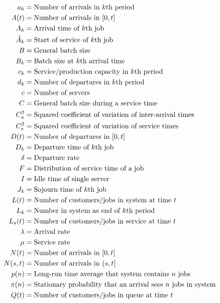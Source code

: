 \documentclass[stochastic-or.tex]{subfiles}
\begin{document}
\begin{align*}
 a_k &= \text{Number of arrivals in~$k$th period} \\
 A(t) &= \text{Number of arrivals in $[0,t]$} \\
 A_k &= \text{Arrival time of~$k$th job} \\
 \As_{k} &= \text{Start of service of~$k$th job} \\
 B &= \text{General batch size} \\
 B_k &= \text{Batch size  at  $k$th arrival time} \\
 c_k &= \text{Service/production capacity in~$k$th period} \\
 d_k &= \text{Number of departures in~$k$th period} \\
 c &= \text{Number of servers} \\
 C &= \text{General batch size during a service time} \\
 C_a^2 &= \text{Squared coefficient of variation of  inter-arrival times} \\
 C_s^2 &= \text{Squared coefficient of variation of  service times} \\
 D(t) &= \text{Number of departures in $[0,t]$} \\
 D_k &= \text{Departure time of~$k$th job} \\
 \delta &= \text{Departure rate} \\
 F &= \text{Distribution of  service time of a job} \\
 I &= \text{Idle time of single server} \\
\J_k &= \text{Sojourn time of~$k$th job} \\
 \L(t) &= \text{Number of customers/jobs in  system at time~$t$} \\
 \L_k &= \text{Number in  system as  end of~$k$th period} \\
 \Ls(t) &= \text{Number of customers/jobs in service at time~$t$} \\
 \lambda &= \text{Arrival rate} \\
 \mu &= \text{Service rate} \\
 N(t) &= \text{Number of arrivals in $[0,t]$} \\
 N(s,t) &= \text{Number of arrivals in $(s,t]$} \\
 p(n) &= \text{Long-run time average that  system contains~$n$ jobs} \\
 \pi(n) &= \text{Stationary probability that an arrival sees~$n$ jobs in  system} \\
 \QQ(t) &= \text{Number of customers/jobs in queue at time~$t$} \\

\end{align*}
\end{document}
